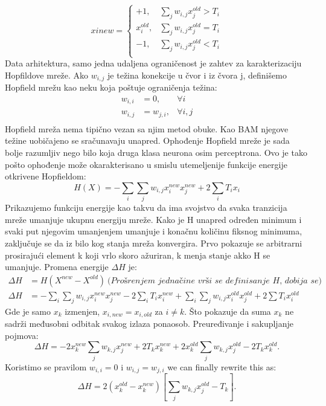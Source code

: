 \documentclass[fontsize=11bp, paper=a4]{scrarticle}
\begin{document}
$$
x inew = \begin{cases}
    +1,& \sum_j w_{i,j} x_j^{old} > T_i\\
    x_i^{old},& \sum_j w_{i,j} x_j^{old} = T_i \\
    -1,& \sum_j w_{i,j} x_j^{old} < T_i\\ 
\end{cases}
$$
Data arhitektura, samo jedna udaljena ograničenost je zahtev za karakterizaciju Hopfildove mreže. Ako $w_{i,j}$ je težina konekcije u čvor i iz čvora j, definišemo Hopfield mrežu kao neku koja poštuje ograničenja težina:
$$
\begin{aligned}
    w_{i,i} &= 0, &\forall i \\
    w_{i,j} &= w_{j,i}, &\forall i,j\\
\end{aligned}
$$
Hopfield mreža nema tipično vezan sa njim metod obuke. Kao BAM njegove težine uobičajeno se sračunavaju unapred. Ophođenje Hopfield mreže je sada bolje razumljiv nego bilo koja druga klasa neurona osim perceptrona. Ovo je tako pošto ophođenje može okarakterisano u smislu utemeljenije funkcije energije otkrivene Hopfieldom:
$$ H ( X ) = -\sum_i\sum_j w_{i,j} x_i^{new} x_j^{new} + 2 \sum_i T_i x_i$$
Prikazujemo funkciju energije kao takvu da ima svojstvo da svaka tranzicija mreže umanjuje ukupnu energiju mreže. Kako je H unapred određen minimum i svaki put njegovim umanjenjem umanjuje i konačnu količinu fiksnog minimuma, zaključuje se da iz bilo kog stanja mreža konvergira. Prvo pokazuje se arbitrarni prosirajući element k koji vrlo skoro ažuriran, k menja stanje akko H se umanjuje. Promena energije $\Delta H$ je: 
$$
\begin{aligned}
    \Delta H & = H(X^{new}- X^{old}) \ \textit{(Prošrenjem jednačine vrši se definisanje H, dobija se)} \\
    \Delta H &= - \sum_i \sum_j w_{i,j} x_i^{new} x_j^{new} - 2 \sum_i T_i x_i^{new} + \sum_i\sum_j w_{i,j} x_i^{old} x_j^{old} + 2 \sum T_i x_i^{old}
\end{aligned}
$$
Gde je samo $x_k$ izmenjen, $x_{i, new} = x_{i,old}$ za $i \ne k$. Što pokazuje da suma $x_k$ ne sadrži međusobni odbitak svakog izlaza ponaosob. Preuređivanje i sakupljanje pojmova:
$$
\Delta H = - 2x_k^{new} \sum_j w_{k,j} x_j^{new} + 2T_k x_k^{new} + 2x_k^{old} \sum_j w_{k,j} x_j^{old} - 2T_k x_k^{old}.
$$
Koristimo se pravilom $w_{i,i} = 0$ i $w_{i,j} = w_{j,i}$ we can finally rewrite this as:
$$\Delta H = 2 ( x_k^{old} - x_k^{new} ) [\sum_j w_{k,j} x_j^{old} - T_k].$$
\end{document}
